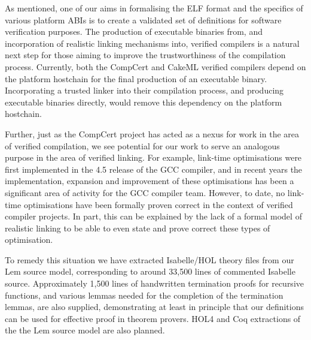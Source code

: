 As mentioned, one of our aims in formalising the ELF format and the specifics of various platform ABIs is to create a validated set of definitions for software verification purposes.
The production of executable binaries from, and incorporation of realistic linking mechanisms into, verified compilers is a natural next step for those aiming to improve the trustworthiness of the compilation process.
Currently, both the CompCert and CakeML verified compilers depend on the platform hostchain for the final production of an executable binary.
Incorporating a trusted linker into their compilation process, and producing executable binaries directly, would remove this dependency on the platform hostchain.

Further, just as the CompCert project has acted as a nexus for work in the area of verified compilation, we see potential for our work to serve an analogous purpose in the area of verified linking.
For example, link-time optimisations were first implemented in the 4.5 release of the GCC compiler, and in recent years the implementation, expansion and improvement of these optimisations has been a significant area of activity for the GCC compiler team.
However, to date, no link-time optimisations have been formally proven correct in the context of verified compiler projects.
In part, this can be explained by the lack of a formal model of realistic linking to be able to even state and prove correct these types of optimisation.

To remedy this situation we have extracted Isabelle/HOL theory files from our Lem source model, corresponding to around 33,500 lines of commented Isabelle source.
Approximately 1,500 lines of handwritten termination proofs for recursive functions, and various lemmas needed for the completion of the termination lemmas, are also supplied, demonstrating at least in principle that our definitions can be used for effective proof in theorem provers.
HOL4 and Coq extractions of the the Lem source model are also planned.
